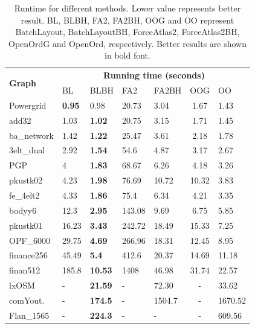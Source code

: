 \documentclass{vgtc}
\newcommand{\toolname}{{BatchLayout}}
\newcommand{\toolnameBH}{{BatchLayoutBH}}
\begin{document}
\begin{table}[!tb]
\caption{Runtime for different methods. Lower value represents better result. BL, BLBH, FA2, FA2BH, OOG and OO represent \toolname{}, \toolnameBH{}, ForceAtlas2, ForceAtlas2BH, OpenOrdG and OpenOrd, respectively. Better results are shown in bold font.}
\vspace{-4pt}
\centering
\begin{tabular}{|p{1.2cm}|p{0.63cm}|p{0.6cm}|p{0.65cm}|p{0.7cm}|c|p{0.8cm}|}
\hline
\multirow{2}{*}{\textbf{Graph}} & \multicolumn{6}{c|}{\textbf{Running time (seconds)}} \\ \cline{2-7} 
                                & BL   & BLBH   & FA2   & FA2BH   & OOG   & OO  \\ \hline
Powergrid	    &   \textbf{0.95}	&   0.98	&   20.73	&   3.04	&   1.67 & 1.43\\ \hline
add32	&   1.03	&   \textbf{1.02}	&   20.75	&   3.15	&   1.71 &   1.45 \\ \hline
ba\_network	&   1.42	&   \textbf{1.22}	&   25.47	&   3.61	&   2.18 & 1.78 \\ \hline
3elt\_dual	&   2.92	&   \textbf{1.54}	&   54.6	&   4.87	&   3.17 & 2.67 \\ \hline
PGP	&   4	&   \textbf{1.83}	&   68.67	&   6.26	&   4.18 & 3.26\\ \hline

pkustk02	&   4.23	&   \textbf{1.98}	&   76.69	&   10.72	&   10.32 & 3.83 \\ \hline
fe\_4elt2	&   4.33	&   \textbf{1.86}	&   75.4	&   6.34	&   4.21 & 3.35 \\ \hline
bodyy6	&   12.3	&  \textbf{2.95}	&   143.08	&   9.69	&   6.75 & 5.85 \\ \hline
pkustk01	&   16.23	&   \textbf{3.43}	&   242.72	&   18.49	&   15.33 & 7.25 \\ \hline
OPF\_6000	&   29.75	&   \textbf{4.69}	&   266.96	&   18.31	&   12.45 & 8.95\\ \hline
finance256	&   45.49	&   \textbf{5.4}    &   412.6	&   20.37	&   14.69 & 11.18\\ \hline
finan512	&   185.8	&   \textbf{10.53}	&   1408	&   46.98	&   31.74 & 22.57\\ \hline
lxOSM	&   -	&   \textbf{21.59}	&   -	&  72.30 	&  -  & 33.62 \\ \hline
comYout.	&   -	&   \textbf{174.5}	&   -	&   1504.7	& -    & 1670.52 \\ \hline
Flan\_1565	&  -	&   \textbf{224.3}	&   -	&   -	&   - & 609.56 \\ \hline
\end{tabular}
\label{tab:runningtime}
\vspace{-0.4cm}
\end{table}
\end{document}
